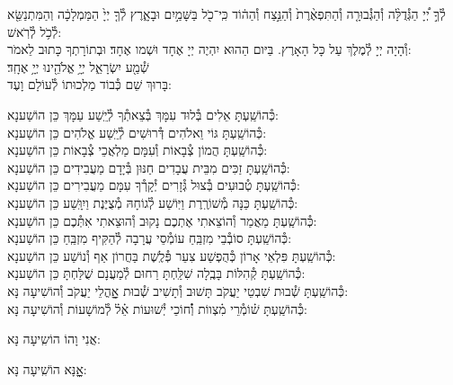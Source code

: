 \documentclass[twoside, openany, parskip=half, 11pt]{book}
\begin{document}
לְ֯ךָ֣ יְ֠יָ הַגְּ֯דֻלָּ֨ה וְ֯הַגְּ֯בוּרָ֤ה וְ֯הַתִּפְאֶ֨רֶת֙ וְ֯הַנֵּ֣צַח וְ֯הַה֔וֹד
כִּֽי־כֹ֖ל בַּשָּׁמַ֣יִם וּבָאָ֑רֶץ לְ֯ךָ֤ יְיָ֙ הַמַּמְלָכָ֔ה
וְהַמִּתְנַשֵּׂ֖א לְ֯כֹ֥ל לְ֯רֹֽאשׁ:\\
וְ֯הָיָה יְיָ לְ֯מֶלֶךְ עַל כָּל הָאָרֶץ. בַּיּום הַהוּא יִהְיֶה יְיָ אֶחָד וּשְׁמו אֶחָד׃ וּבְתוֹרָתְךָ כָּתוּב לֵאמֹר: \\
שְׁ֯מַ֖ע יִשְׂרָאֵ֑ל יְיָ֥ אֱלֹהֵ֖ינוּ יְיָ֥ אֶחָֽד׃\\
בָּרוּךְ שֵׁם כְּ֯בוֹד מַלְכוּתוֹ לְ֯עוֹלָם וָעֶד:

\begin{small}
כְּ֯הוֹשַֽׁעְתָּ אֵלִים בְּ֯לוּד עִמָּךְ בְּ֯צֵאתְ֯ךָ לְ֯יֵֽשַׁע עַמָּךְ \hfill כֵּן הוֹשַׁענָא: \\
כְּ֯הוֹשַֽׁעְתָּ גּוֹי וֵאלֹהִים דְּ֯רוּשִׁים לְ֯יֵֽשַׁע אֱלֹהִים \hfill כֵּן הוֹשַׁענָא: \\
כְּ֯הוֹשַֽׁעְתָּ הֲמוֹן צְ֯בָאוֹת וְ֯עִמָּם מַלְאֲכֵי צְ֯בָאוֹת \hfill כֵּן הוֹשַׁענָא: \\
כְּ֯הוֹשַֽׁעְתָּ זַכִּים מִבֵּית עֲבָדִים חַנּוּן בְּ֯יָדָם מַעֲבִידִים \hfill כֵּן הוֹשַׁענָא: \\
כְּ֯הוֹשַֽׁעְתָּ טְ֯בוּעִים בְּ֯צוּל גְּ֯זָרִים יְ֯קָרְ֯ךָ עִמָּם מַעֲבִירִים \hfill כֵּן הוֹשַׁענָא: \\
כְּ֯הוֹשַֽׁעְתָּ כַּנָּה מְ֯שׁוֹרֶֽרֶת וַיּֽוֹשַׁע לְ֯גוֹחָהּ מְ֯צֻיֶּנֶת וַיִוָּֽשַׁע \hfill כֵּן הוֹשַׁענָא: \\
כְּ֯הוֹשַֽׁעְתָּ מַאֲמַר וְ֯הוֹצֵאתִי אֶתְכֶם נָקוּב וְ֯הוּצֵאתִי אִתְּ֯כֶם \hfill כֵּן הוֹשַׁענָא:\\
כְּ֯הוֹשַֽׁעְתָּ סוֹבְ֯בֵי מִזְבֵּֽחַ עוֹמְ֯סֵי עֲרָבָה לְ֯הַקִּיף מִזְבֵּֽחַ \hfill כֵּן הוֹשַׁענָא: \\
כְּ֯הוֹשַֽׁעְתָּ פִּלְאֵי אָרוֹן כְּ֯הֻפְשַׁע צִעֵר פְּ֯לֶֽשֶׁת בַּחֲרוֹן אַף וְ֯נוֹשַׁע \hfill כֵּן הוֹשַׁענָא: \\
כְּ֯הוֹשַֽׁעְתָּ קְ֯הִלּוֹת בָּבֶֽלָה שִׁלַּֽחְתָּ רַחוּם לְ֯מַעֲנָם שֻׁלַּחְתָּ \hfill כֵּן הוֹשַׁענָא:\\
כְּ֯הוֹשַֽׁעְתָּ שְׁ֯בוּת שִׁבְטֵי יַעֲקֹב תָּשׁוּב וְ֯תָשִׁיב שְׁ֯בוּת אׇׇׇׇהֳלֵי יַעֲקֹב \hfill וְ֯הוֹשִׁיעָה נָּא:\\
כְּ֯הוֹשַֽׁעְתָּ שׁ֗וֹמְ֯רֵי מִ֗צְווֹת וְ֯֗חוֹכֵי יְ֯שׁוּעוֹת אֵ֗ל֗ לְ֯מוֹשָׁעוֹת \hfill וְ֯הוֹשִׁיעָה נָּא:

\end{small}

\begin{large}
\chazzan
אֲנִי וָהוֹ הוֹשִֽיעָה נָּא:

\shatzvkahal
אׇׇׇׇָנָּא הוֹשִֽׁיעָה נָּא:

\end{large}
\end{document}
